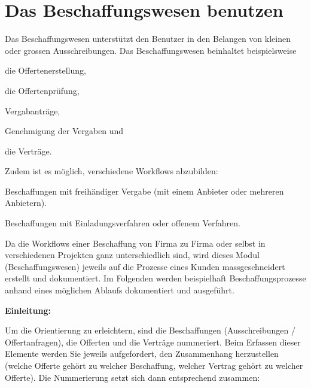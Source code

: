 
\clearpage
\section{Das Beschaffungswesen benutzen}

Das Beschaffungswesen unterstützt den Benutzer in den Belangen von kleinen oder grossen Ausschreibungen. Das Beschaffungswesen beinhaltet beispielsweise

\begin{compactitem}
\item die Offertenerstellung,
\item die Offertenprüfung,
\item Vergabanträge,
\item Genehmigung der Vergaben und
\item die Verträge.
\end{compactitem}

\vspace{\baselineskip}

Zudem ist es möglich, verschiedene Workflows abzubilden:

\begin{compactitem}
\item Beschaffungen mit freihändiger Vergabe (mit einem Anbieter oder mehreren Anbietern).
\item Beschaffungen mit Einladungsverfahren oder offenem Verfahren.
\end{compactitem}

\vspace{\baselineskip}

Da die Workflows einer Beschaffung von Firma zu Firma oder selbst in verschiedenen Projekten ganz unterschiedlich sind, wird dieses Modul (Beschaffungswesen) jeweils auf die Prozesse eines Kunden massgeschneidert erstellt und dokumentiert. Im Folgenden werden beispielhaft Beschaffungsprozesse anhand eines möglichen Ablaufs dokumentiert und ausgeführt.

\vspace{\baselineskip}

\textbf{Einleitung:}

Um die Orientierung zu erleichtern, sind die Beschaffungen (Ausschreibungen / Offertanfragen), die Offerten und die Verträge nummeriert. Beim Erfassen dieser Elemente werden Sie jeweils aufgefordert, den Zusammenhang herzustellen (welche Offerte gehört zu welcher Beschaffung, welcher Vertrag gehört zu welcher Offerte). Die Nummerierung setzt sich dann entsprechend zusammen:

